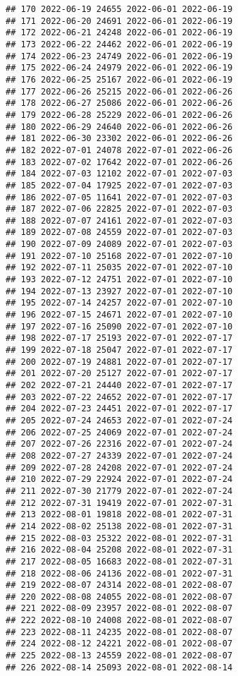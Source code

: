 \documentclass[
]{article}
\begin{document}
\begin{verbatim}
## 170 2022-06-19 24655 2022-06-01 2022-06-19
## 171 2022-06-20 24691 2022-06-01 2022-06-19
## 172 2022-06-21 24248 2022-06-01 2022-06-19
## 173 2022-06-22 24462 2022-06-01 2022-06-19
## 174 2022-06-23 24749 2022-06-01 2022-06-19
## 175 2022-06-24 24979 2022-06-01 2022-06-19
## 176 2022-06-25 25167 2022-06-01 2022-06-19
## 177 2022-06-26 25215 2022-06-01 2022-06-26
## 178 2022-06-27 25086 2022-06-01 2022-06-26
## 179 2022-06-28 25229 2022-06-01 2022-06-26
## 180 2022-06-29 24640 2022-06-01 2022-06-26
## 181 2022-06-30 23302 2022-06-01 2022-06-26
## 182 2022-07-01 24078 2022-07-01 2022-06-26
## 183 2022-07-02 17642 2022-07-01 2022-06-26
## 184 2022-07-03 12102 2022-07-01 2022-07-03
## 185 2022-07-04 17925 2022-07-01 2022-07-03
## 186 2022-07-05 11641 2022-07-01 2022-07-03
## 187 2022-07-06 22825 2022-07-01 2022-07-03
## 188 2022-07-07 24161 2022-07-01 2022-07-03
## 189 2022-07-08 24559 2022-07-01 2022-07-03
## 190 2022-07-09 24089 2022-07-01 2022-07-03
## 191 2022-07-10 25168 2022-07-01 2022-07-10
## 192 2022-07-11 25035 2022-07-01 2022-07-10
## 193 2022-07-12 24751 2022-07-01 2022-07-10
## 194 2022-07-13 23927 2022-07-01 2022-07-10
## 195 2022-07-14 24257 2022-07-01 2022-07-10
## 196 2022-07-15 24671 2022-07-01 2022-07-10
## 197 2022-07-16 25090 2022-07-01 2022-07-10
## 198 2022-07-17 25193 2022-07-01 2022-07-17
## 199 2022-07-18 25047 2022-07-01 2022-07-17
## 200 2022-07-19 24881 2022-07-01 2022-07-17
## 201 2022-07-20 25127 2022-07-01 2022-07-17
## 202 2022-07-21 24440 2022-07-01 2022-07-17
## 203 2022-07-22 24652 2022-07-01 2022-07-17
## 204 2022-07-23 24451 2022-07-01 2022-07-17
## 205 2022-07-24 24653 2022-07-01 2022-07-24
## 206 2022-07-25 24069 2022-07-01 2022-07-24
## 207 2022-07-26 22316 2022-07-01 2022-07-24
## 208 2022-07-27 24339 2022-07-01 2022-07-24
## 209 2022-07-28 24208 2022-07-01 2022-07-24
## 210 2022-07-29 22924 2022-07-01 2022-07-24
## 211 2022-07-30 21779 2022-07-01 2022-07-24
## 212 2022-07-31 19419 2022-07-01 2022-07-31
## 213 2022-08-01 19818 2022-08-01 2022-07-31
## 214 2022-08-02 25138 2022-08-01 2022-07-31
## 215 2022-08-03 25322 2022-08-01 2022-07-31
## 216 2022-08-04 25208 2022-08-01 2022-07-31
## 217 2022-08-05 16683 2022-08-01 2022-07-31
## 218 2022-08-06 24136 2022-08-01 2022-07-31
## 219 2022-08-07 24314 2022-08-01 2022-08-07
## 220 2022-08-08 24055 2022-08-01 2022-08-07
## 221 2022-08-09 23957 2022-08-01 2022-08-07
## 222 2022-08-10 24008 2022-08-01 2022-08-07
## 223 2022-08-11 24235 2022-08-01 2022-08-07
## 224 2022-08-12 24221 2022-08-01 2022-08-07
## 225 2022-08-13 24559 2022-08-01 2022-08-07
## 226 2022-08-14 25093 2022-08-01 2022-08-14

\end{verbatim}
\end{document}
